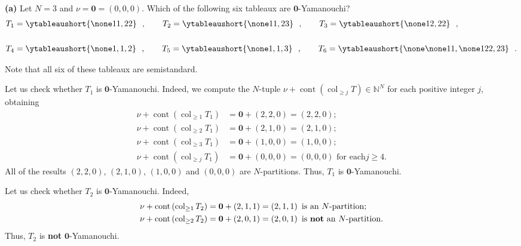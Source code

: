 \begin{example}
\label{exa.sf.yamanouchi.1}\textbf{(a)} Let $N=3$ and $\nu=\mathbf{0}=\left(
0,0,0\right)  $. Which of the following six tableaux are $\mathbf{0}%
$-Yamanouchi?%
\begin{align*}
T_{1}  &  =\ytableaushort{\none 11,22}\ \ ,\qquad T_{2}%
=\ytableaushort{\none 11,23}\ \ ,\qquad T_{3}%
=\ytableaushort{\none 12,22}\ \ ,\\
& \\
T_{4}  &  =\ytableaushort{\none 1,1,2}\ \ ,\qquad T_{5}%
=\ytableaushort{\none 1,1,3}\ \ ,\qquad T_{6}%
=\ytableaushort{\none\none 11,\none 122,23}\ \ .
\end{align*}


Note that all six of these tableaux are semistandard.

Let us check whether $T_{1}$ is $\mathbf{0}$-Yamanouchi. Indeed, we compute
the $N$-tuple $\nu+\operatorname*{cont}\left(  \operatorname{col}_{\geq
j}T\right)  \in\mathbb{N}^{N}$ for each positive integer $j$, obtaining
\begin{align*}
\nu+\operatorname*{cont}\left(  \operatorname{col}_{\geq1}T_{1}\right)   &
=\mathbf{0}+\left(  2,2,0\right)  =\left(  2,2,0\right)  ;\\
\nu+\operatorname*{cont}\left(  \operatorname{col}_{\geq2}T_{1}\right)   &
=\mathbf{0}+\left(  2,1,0\right)  =\left(  2,1,0\right)  ;\\
\nu+\operatorname*{cont}\left(  \operatorname{col}_{\geq3}T_{1}\right)   &
=\mathbf{0}+\left(  1,0,0\right)  =\left(  1,0,0\right)  ;\\
\nu+\operatorname*{cont}\left(  \operatorname{col}_{\geq j}T_{1}\right)   &
=\mathbf{0}+\left(  0,0,0\right)  =\left(  0,0,0\right)  \text{ for each
}j\geq4\text{.}%
\end{align*}
All of the results $\left(  2,2,0\right)  $, $\left(  2,1,0\right)  $,
$\left(  1,0,0\right)  $ and $\left(  0,0,0\right)  $ are $N$-partitions.
Thus, $T_{1}$ is $\mathbf{0}$-Yamanouchi.

Let us check whether $T_{2}$ is $\mathbf{0}$-Yamanouchi. Indeed,%
\begin{align*}
\nu+\operatorname*{cont}\left(  \operatorname{col}_{\geq1}T_{2}\right)   &
=\mathbf{0}+\left(  2,1,1\right)  =\left(  2,1,1\right)  \text{ is an
}N\text{-partition;}\\
\nu+\operatorname*{cont}\left(  \operatorname{col}_{\geq2}T_{2}\right)   &
=\mathbf{0}+\left(  2,0,1\right)  =\left(  2,0,1\right)  \text{ is
\textbf{not} an }N\text{-partition.}%
\end{align*}
Thus, $T_{2}$ is \textbf{not} $\mathbf{0}$-Yamanouchi.


\end{example}
